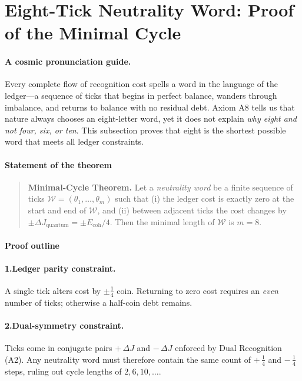 \documentclass[11pt,oneside]{book}
\begin{document}
\section{Eight-Tick Neutrality Word: Proof of the Minimal Cycle}
\label{sec:eight-tick-word}

\paragraph*{A cosmic pronunciation guide.}
Every complete flow of recognition cost spells a word in the language of
the ledger—a sequence of ticks that begins in perfect balance, wanders
through imbalance, and returns to balance with no residual debt.
Axiom A8 tells us that nature always chooses an eight-letter word, yet it
does not explain \emph{why eight and not four, six, or ten}.  
This subsection proves that eight is the shortest possible word that
meets all ledger constraints.

\paragraph*{Statement of the theorem}

\begin{quote}
\textbf{Minimal-Cycle Theorem.}\;
Let a \emph{neutrality word} be a finite sequence of ticks
$\mathcal W=(\theta_{1},\dots,\theta_{m})$
such that (i) the ledger cost is exactly zero at the start and end of
$\mathcal W$, and (ii) between adjacent ticks the cost changes by
$\pm\Delta J_{\text{quantum}} = \pm E_{\text{coh}}/4$.  
Then the minimal length of $\mathcal W$ is $m=8$.
\end{quote}

\paragraph*{Proof outline}

\paragraph*{1.\;Ledger parity constraint.}
A single tick alters cost by $\pm\frac14$ coin.  Returning to zero cost
requires an \emph{even} number of ticks; otherwise a half-coin debt
remains.

\paragraph*{2.\;Dual-symmetry constraint.}
Ticks come in conjugate pairs $+\,\Delta J$ and $-\,\Delta J$
enforced by Dual Recognition (A2).  
Any neutrality word must therefore contain the same count of
$+\,\frac14$ and $-\,\frac14$ steps, ruling out cycle lengths of
$2,6,10,\dots$.
\end{document}
